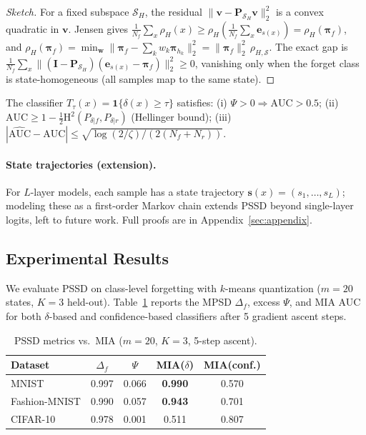 \documentclass[smallextended]{svjour3}       %
\begin{document}
\begin{proof}[Sketch]
For a fixed subspace $\mathcal{S}_H$, the residual $\|\mathbf{v}-\mathbf{P}_{\mathcal{S}_H}\mathbf{v}\|_2^2$ is a convex quadratic in $\mathbf{v}$. Jensen gives $\frac1{N_f}\sum_x\rho_H(x)\ge\rho_H(\frac1{N_f}\sum_x\mathbf{e}_{s(x)})=\rho_H(\boldsymbol{\pi}_f)$, and $\rho_H(\boldsymbol{\pi}_f)=\min_{\mathbf{w}}\|\boldsymbol{\pi}_f-\sum_k w_k\boldsymbol{\pi}_{h_k}\|_2^2=\|\boldsymbol{\pi}_f\|_2^2\,\rho_{H,\mathcal{S}}$. The exact gap is $\frac1{N_f}\sum_x\|(\mathbf{I}-\mathbf{P}_{\mathcal{S}_H})(\mathbf{e}_{s(x)}-\boldsymbol{\pi}_f)\|_2^2\ge0$, vanishing only when the forget class is state-homogeneous (all samples map to the same state).
\end{proof}

\begin{theorem}
\label{thm:pssd_mia}
The classifier $T_\tau(x)=\mathbf{1}\{\delta(x)\ge\tau\}$ satisfies: (i) $\Psi>0\Rightarrow\mathrm{AUC}>0.5$; (ii) $\mathrm{AUC}\ge1-\frac12\mathrm{H}^2(P_{\delta|f},P_{\delta|r})$ (Hellinger bound); (iii) $|\widehat{\mathrm{AUC}}-\mathrm{AUC}|\le\sqrt{\log(2/\zeta)/(2(N_f+N_r))}$.
\end{theorem}

\paragraph{State trajectories (extension).}
For $L$-layer models, each sample has a state trajectory $\mathbf{s}(x)=(s_1,\dots,s_L)$; modeling these as a first-order Markov chain extends PSSD beyond single-layer logits, left to future work. Full proofs are in Appendix~\ref{sec:appendix}.

\subsection{Experimental Results}

We evaluate PSSD on class-level forgetting with $k$-means quantization ($m{=}20$ states, $K{=}3$ held-out). Table~\ref{tab:pssd_results} reports the MPSD $\Delta_f$, excess $\Psi$, and MIA AUC for both $\delta$-based and confidence-based classifiers after 5 gradient ascent steps.

\begin{table}[t]
\centering
\small
\caption{PSSD metrics vs.\ MIA ($m{=}20$, $K{=}3$, 5-step ascent).}\label{tab:pssd_results}
\setlength{\tabcolsep}{2pt}
\begin{tabular}{l c c c c}
\toprule
Dataset & $\Delta_f$ & $\Psi$ & MIA($\delta$) & MIA(conf.) \\
\midrule
MNIST & 0.997 & 0.066 & \textbf{0.990} & 0.570 \\
Fashion-MNIST & 0.990 & 0.057 & \textbf{0.943} & 0.701 \\
CIFAR-10 & 0.978 & 0.001 & 0.511 & 0.807 \\
\bottomrule
\end{tabular}
\end{table}
\end{document}
